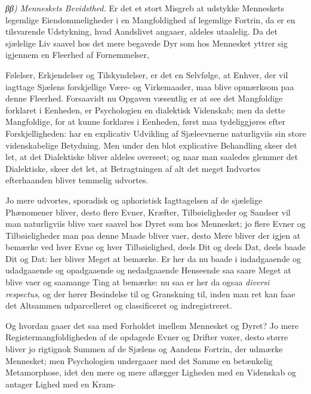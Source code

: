 \documentclass[12pt,a4paper]{book}
\begin{document}
\emph{ββ) Menneskets Bevidsthed.} Er det et stort Misgreb at udstykke Menneskets
legemlige Eiendommeligheder i en Mangfoldighed af legemlige Fortrin, da er en
tilsvarende Udstykning, hvad Aandslivet angaaer, aldeles utaalelig. Da det
sjælelige Liv saavel hos det mere begavede Dyr som hos Mennesket yttrer sig
igjennem en Fleerhed af Fornemmelser,

Følelser, Erkjendelser og Tilskyndelser, er det en Selvfølge, at Enhver, der vil
iagttage Sjælens forskjellige Være- og Virkemaader, maa blive opmærksom paa
denne Fleerhed. Forsaavidt nu Opgaven væsentlig er at see det Mangfoldige
forklaret i Eenheden, er Psychologien en dialektisk Videnskab; men da dette
Mangfoldige, for at kunne forklares i Eenheden, først maa tydeliggjøres efter
Forskjelligheden: har en explicativ Udvikling af Sjæleevnerne naturligviis sin
store videnskabelige Betydning. Men under den blot explicative Behandling skeer
det let, at det Dialektiske bliver aldeles overseet; og naar man saaledes
glemmer det Dialektiske, skeer det let, at Betragtningen af alt det meget
Indvortes efterhaanden bliver temmelig udvortes.

Jo mere udvortes, sporadisk og aphoristisk Iagttagelsen af de sjælelige
Phænomener bliver, desto flere Evner, Kræfter, Tilbøieligheder og Sandser vil
man naturligviis blive vaer saavel hos Dyret som hos Mennesket; jo flere Evner
og Tilbøieligheder man paa denne Maade bliver vaer, desto Mere bliver der igjen
at bemærke ved hver Evne og hver Tilbøielighed, deels Dit og deels Dat, deels
baade Dit og Dat: her bliver Meget at bemærke. Er her da nu baade i indadgaaende
og udadgaaende og opadgaaende og nedadgaaende Henseende saa saare Meget at blive
vaer og saamange Ting at bemærke: nu saa er her da ogsaa \textit{diversi
respectus}, og der hører Besindelse til og Granskning til, inden man ret kan
faae det Altsammen udparcelleret og classificeret og indregistreret.

Og hvordan gaaer det saa med Forholdet imellem Mennesket og Dyret? Jo mere
Registermangfoldigheden af de opdagede Evner og Drifter voxer, desto større
bliver jo rigtignok Summen af de Sjælens og Aandens Fortrin, der udmærke
Mennesket; men Psychologien undergaaer med det Samme en betænkelig Metamorphose,
idet den mere og mere aflægger Ligheden med en Videnskab og antager Lighed med
en Kram-
\end{document}
